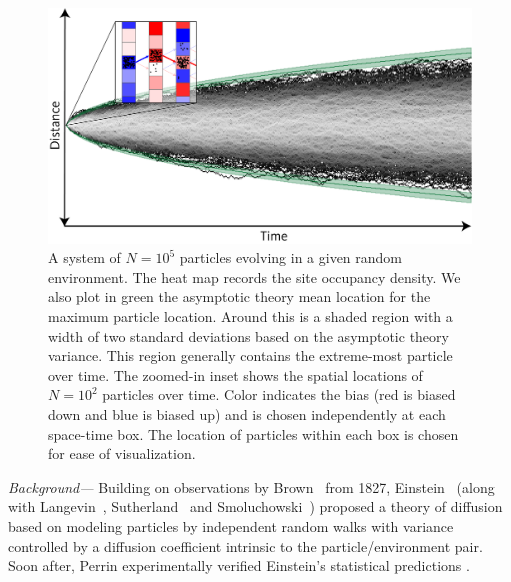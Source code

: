 \documentclass[%
 reprint,
 amsmath,amssymb,
 longbibliography,
 aps,
prl
]{revtex4-1}
\begin{document}
\begin{figure}[h]
	\includegraphics[width=.9\columnwidth]{Figure1.pdf}
  \caption{A system of $N=10^5$ particles evolving in a given random environment. The heat map records the site occupancy density. We also plot in green the asymptotic theory mean location for the maximum particle location. Around this is a shaded region with a width of two standard deviations based on the asymptotic theory variance. This region generally contains the extreme-most particle over time. The zoomed-in inset shows the spatial locations of $N=10^2$ particles over time. Color indicates the bias (red is biased down and blue is biased up) and is chosen independently at each space-time box. The location of particles within each box is chosen for ease of visualization.}
  \label{fig:BCModel}
\end{figure}

\medskip\noindent\emph{Background---}
Building on observations by Brown~\cite{brownXXVIIBriefAccount1828a, brownXXIVAdditionalRemarks1829a} from 1827,  Einstein~\cite{einsteinUberMolekularkinetischenTheorie1905b,einsteinZurTheorieBrownschen1906a, einsteinTheoretischeBemerkungenUber1907a} (along with Langevin~\cite{langevinTheorieMouvementBrownien1908a}, Sutherland~\cite{sutherlandLIIViscosityGases1893,sutherlandLXXVDynamicalTheory1905} and Smoluchowski~\cite{vonsmoluchowskiZurKinetischenTheorie1906, vonsmoluchowskiNotizUiberBerechnung1915}) proposed a theory of diffusion based on modeling particles by independent random walks with variance controlled by a diffusion coefficient intrinsic to the particle/environment pair. Soon after, Perrin experimentally verified Einstein's statistical predictions \cite{perrinMouvementBrownienRealite1909a, perrinMouvementBrownienMolecules1910a}.
\end{document}
